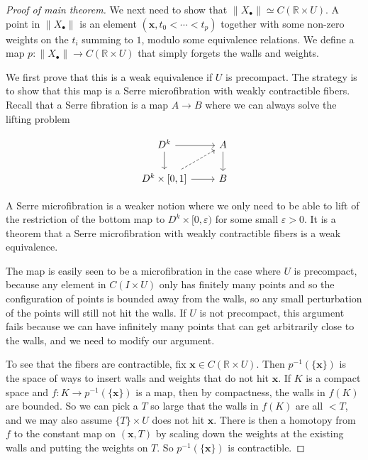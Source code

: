 \documentclass{shortart}
\theoremstyle{definition}
\newcommand\R{\mathbb{R}}
\begin{document}
\begin{proof}[Proof of main theorem]
  We next need to show that $\|X_\bullet\| \simeq C(\R \times U)$. A point in $\|X_\bullet\|$ is an element $(\mathbf{x}, t_0 < \cdots < t_p)$ together with some non-zero weights on the $t_i$ summing to $1$, modulo some equivalence relations. We define a map $p: \|X_\bullet\| \to C(\R \times U)$ that simply forgets the walls and weights.

  We first prove that this is a weak equivalence if $U$ is precompact. The strategy is to show that this map is a Serre microfibration with weakly contractible fibers. Recall that a Serre fibration is a map $A \to B$ where we can always solve the lifting problem
  \begin{useimager}
    \[
      \begin{tikzcd}
        D^k \ar[d] \ar[r] & A \ar[d]\\
        D^k \times [0, 1] \ar[r] \ar[ur, dashed] & B
      \end{tikzcd}
    \]
  \end{useimager}
  A Serre microfibration is a weaker notion where we only need to be able to lift of the restriction of the bottom map to $D^k \times [0, \varepsilon)$ for some small $\varepsilon > 0$. It is a theorem that a Serre microfibration with weakly contractible fibers is a weak equivalence.

  The map is easily seen to be a microfibration in the case where $U$ is precompact, because any element in $C(I \times U)$ only has finitely many points and so the configuration of points is bounded away from the walls, so any small perturbation of the points will still not hit the walls. If $U$ is not precompact, this argument fails because we can have infinitely many points that can get arbitrarily close to the walls, and we need to modify our argument.

  To see that the fibers are contractible, fix $\mathbf{x} \in C(\R \times U)$. Then $p^{-1}(\{\mathbf{x}\})$ is the space of ways to insert walls and weights that do not hit $\mathbf{x}$. If $K$ is a compact space and $f: K \to p^{-1}(\{\mathbf{x}\})$ is a map, then by compactness, the walls in $f(K)$ are bounded. So we can pick a $T$ so large that the walls in $f(K)$ are all $ < T$, and we may also assume $\{T\} \times U$ does not hit $\mathbf{x}$. There is then a homotopy from $f$ to the constant map on $(\mathbf{x}, T)$ by scaling down the weights at the existing walls and putting the weights on $T$. So $p^{-1}(\{\mathbf{x}\})$ is contractible.


\end{proof}
\end{document}
